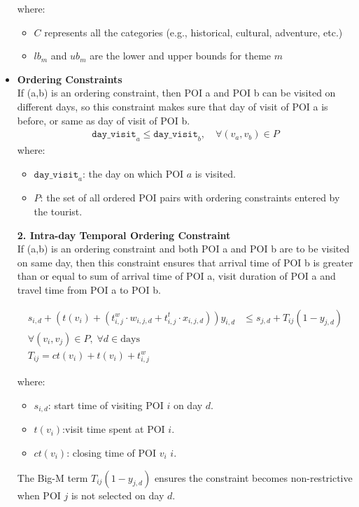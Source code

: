 \documentclass[sigconf,authordraft]{acmart}
\begin{document}
\begin{itemize}
where:
\begin{itemize}
  \item \( C \) represents all the categories (e.g., historical, cultural, adventure, etc.)
  \item \( lb_m \) and \( ub_m \) are the lower and upper bounds for theme \( m \)
\end{itemize}
\item \textbf{Ordering Constraints}\\
If (a,b) is an ordering constraint, then POI a and POI b can be visited on different days, so this constraint makes sure that day of visit of POI a is before, or same as day of visit of POI b.
\begin{align}
\label{mul_day_12}
\texttt{day\_visit}_a \leq \texttt{day\_visit}_b, \quad \forall (v_a, v_b) \in P
\end{align}
\noindent
where:
\begin{itemize}
    \item \( \texttt{day\_visit}_a \): the day on which POI \( a \) is visited.
    \item \( P \): the set of all ordered POI pairs with ordering constraints entered by the tourist.
\end{itemize}

\textbf{2. Intra-day Temporal Ordering Constraint}\\
If (a,b) is an ordering constraint and both POI a and POI b are to be visited on same day, then this constraint ensures that arrival time of POI b is greater than or equal to sum of arrival time of POI a, visit duration of POI a and travel time from POI a to POI b.

\begin{align}
\label{mul_day_13}
s_{i,d} + \left( t(v_i) + \left( t^{w}_{i,j} \cdot w_{i,j,d} + t^{t}_{i,j} \cdot x_{i,j,d} \right) \right) y_{i,d}
&\leq s_{j,d} + T_{ij} (1 - y_{j,d})\\ \forall (v_i, v_j) \in P,\; \forall d \in \text{days} \nonumber \\
\label{mul_day_14}
T_{ij} = ct(v_i) + t(v_i) + t^{w}_{i,j} 
\end{align}



\noindent
where:
\begin{itemize}
    \item \( s_{i,d} \): start time of visiting POI \( i \) on day \( d \).
    \item \( t(v_i) \):visit time spent at POI \( i \).
    \item \( ct(v_i) \): closing time of POI \(v_i\) \( i \).
\end{itemize}

\noindent
The Big-M term \( T_{ij} (1 - y_{j,d}) \) ensures the constraint becomes non-restrictive when POI \( j \) is not selected on day \( d \).
\end{itemize}
\end{document}
